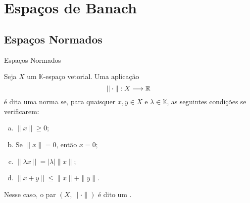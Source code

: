 \section{Espaços de Banach}

\subsection*{Espaços Normados}

\begin{frame}{Espaços Normados}
\begin{defin}
    Seja $X$ um $\mathbb K$-espaço vetorial. Uma aplicação
    \[
    \displaystyle \| \cdot \|: X\longrightarrow \mathbb{R}
    \]
    é dita uma {\color{blue} norma} se, para quaisquer $x,y\in X$ e $\lambda \in \mathbb K$, as seguintes condições se verificarem:
    \begin{enumerate}[(a)]
    \item $\|x\|\geq 0$;
    \item Se $\|x\|=0$, então $x=0$;
    \item $\|\lambda x\|=|\lambda| \|x\|$;
    \item $\|x+y\|\leq \|x\|+\|y\|$.
    \end{enumerate}
    Nesse caso, o par $(X,\|\cdot\|)$ é dito um  .
\end{defin}
\end{frame}


